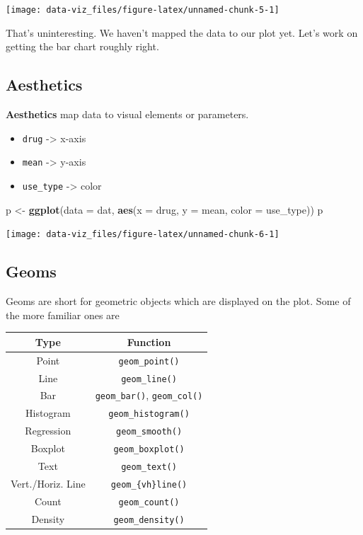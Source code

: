 \documentclass[]{book}
\newenvironment{Shaded}{\begin{snugshade}}{\end{snugshade}}
\newcommand{\DataTypeTok}[1]{\textcolor[rgb]{0.13,0.29,0.53}{#1}}
\newcommand{\KeywordTok}[1]{\textcolor[rgb]{0.13,0.29,0.53}{\textbf{#1}}}
\newcommand{\NormalTok}[1]{#1}
\newcommand{\StringTok}[1]{\textcolor[rgb]{0.31,0.60,0.02}{#1}}
\providecommand{\tightlist}{%
  \setlength{\itemsep}{0pt}\setlength{\parskip}{0pt}}
\theoremstyle{definition}
\theoremstyle{definition}
\theoremstyle{definition}
\theoremstyle{remark}
\begin{document}
\begin{center}\texttt{[image: data-viz\_files/figure-latex/unnamed-chunk-5-1]} \end{center}

That's uninteresting. We haven't mapped the data to our plot yet. Let's
work on getting the bar chart roughly right.

\hypertarget{aesthetics}{%
\subsection{Aesthetics}\label{aesthetics}}

\textbf{Aesthetics} map data to visual elements or parameters.

\begin{itemize}
\tightlist
\item
  \texttt{drug} -\textgreater{} x-axis
\item
  \texttt{mean} -\textgreater{} y-axis
\item
  \texttt{use\_type} -\textgreater{} color
\end{itemize}

\begin{Shaded}
\begin{Highlighting}[]
\NormalTok{p <-}\StringTok{ }\KeywordTok{ggplot}\NormalTok{(}\DataTypeTok{data =}\NormalTok{ dat, }\KeywordTok{aes}\NormalTok{(}\DataTypeTok{x =}\NormalTok{ drug, }\DataTypeTok{y =}\NormalTok{ mean, }\DataTypeTok{color =}\NormalTok{ use_type)) }
\NormalTok{p}
\end{Highlighting}
\end{Shaded}

\begin{center}\texttt{[image: data-viz\_files/figure-latex/unnamed-chunk-6-1]} \end{center}

\hypertarget{geoms}{%
\subsection{Geoms}\label{geoms}}

Geoms are short for geometric objects which are displayed on the plot.
Some of the more familiar ones are

\begin{longtable}[]{@{}cc@{}}
\toprule
Type & Function\tabularnewline
\midrule
\endhead
Point & \texttt{geom\_point()}\tabularnewline
Line & \texttt{geom\_line()}\tabularnewline
Bar & \texttt{geom\_bar()}, \texttt{geom\_col()}\tabularnewline
Histogram & \texttt{geom\_histogram()}\tabularnewline
Regression & \texttt{geom\_smooth()}\tabularnewline
Boxplot & \texttt{geom\_boxplot()}\tabularnewline
Text & \texttt{geom\_text()}\tabularnewline
Vert./Horiz. Line & \texttt{geom\_\{vh\}line()}\tabularnewline
Count & \texttt{geom\_count()}\tabularnewline
Density & \texttt{geom\_density()}\tabularnewline
\bottomrule
\end{longtable}
\end{document}
